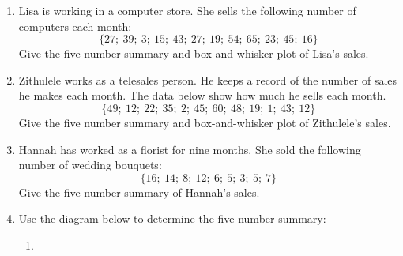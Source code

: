 \begin{exercises}{}{
\begin{enumerate} [itemsep=6pt, label=\textbf{\arabic*}.]

\item Lisa is working in a computer store. She sells the following
  number of computers each month:
  \begin{equation*}
    \{27;\ 39;\ 3;\ 15;\ 43;\ 27;\ 19;\ 54;\ 65;\ 23;\ 45;\ 16\}
  \end{equation*}
  Give the five number summary and box-and-whisker plot of Lisa's
  sales.

\item Zithulele works as a telesales person. He keeps a record of the
  number of sales he makes each month. The data below show how much he
  sells each month.
  \begin{equation*}
    \{49;\ 12;\ 22;\ 35;\ 2;\ 45;\ 60;\ 48;\ 19;\ 1;\ 43;\ 12\}
  \end{equation*}
  Give the five number summary and box-and-whisker plot of Zithulele's
  sales.

\item Hannah has worked as a florist for nine months. She sold the
  following number of wedding bouquets:
  \begin{equation*}
    \{16;\ 14;\ 8;\ 12;\ 6;\ 5;\ 3;\ 5;\ 7\}
  \end{equation*}
  Give the five number summary of Hannah's sales.
\item Use the diagram below to determine the five number summary:
 \begin{enumerate}[noitemsep, label=\textbf{(\alph*)} ]
\item 


\end{enumerate}
\end{enumerate}}
\end{exercises}
